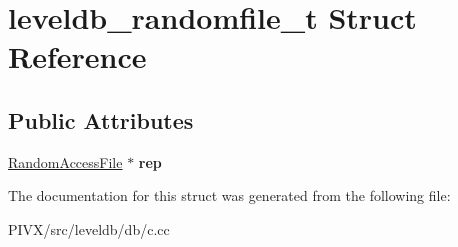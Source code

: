 \hypertarget{structleveldb__randomfile__t}{}\section{leveldb\+\_\+randomfile\+\_\+t Struct Reference}
\label{structleveldb__randomfile__t}
\subsection*{Public Attributes}
\begin{DoxyCompactItemize}
\item 
\mbox{\label{structleveldb__randomfile__t_a66667ecc756a0ca312bbc94e2dfc27a5}} 
\mbox{\hyperlink{classleveldb_1_1_random_access_file}{Random\+Access\+File}} $\ast$ {\bfseries rep}
\end{DoxyCompactItemize}


The documentation for this struct was generated from the following file\+:\begin{DoxyCompactItemize}
\item 
P\+I\+V\+X/src/leveldb/db/c.\+cc\end{DoxyCompactItemize}
